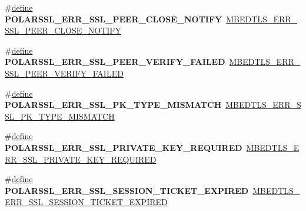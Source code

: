 \begin{DoxyCompactItemize}
\item 
\mbox{\label{compat-1_83_8h_a8e4c3b27c9e170358c71c83683c554da}} 
\#\hyperlink{structdefine}{define} {\bfseries P\+O\+L\+A\+R\+S\+S\+L\+\_\+\+E\+R\+R\+\_\+\+S\+S\+L\+\_\+\+P\+E\+E\+R\+\_\+\+C\+L\+O\+S\+E\+\_\+\+N\+O\+T\+I\+FY}~\hyperlink{ssl_8h_ac5e16e4c94a7e4ba0cf6b95c4547ddb1}{M\+B\+E\+D\+T\+L\+S\+\_\+\+E\+R\+R\+\_\+\+S\+S\+L\+\_\+\+P\+E\+E\+R\+\_\+\+C\+L\+O\+S\+E\+\_\+\+N\+O\+T\+I\+FY}
\item 
\mbox{\label{compat-1_83_8h_ab8af28117b65fb455f8bc95b7f8a1f8a}} 
\#\hyperlink{structdefine}{define} {\bfseries P\+O\+L\+A\+R\+S\+S\+L\+\_\+\+E\+R\+R\+\_\+\+S\+S\+L\+\_\+\+P\+E\+E\+R\+\_\+\+V\+E\+R\+I\+F\+Y\+\_\+\+F\+A\+I\+L\+ED}~\hyperlink{ssl_8h_ac53adea4d4086a8e344459b053a5717b}{M\+B\+E\+D\+T\+L\+S\+\_\+\+E\+R\+R\+\_\+\+S\+S\+L\+\_\+\+P\+E\+E\+R\+\_\+\+V\+E\+R\+I\+F\+Y\+\_\+\+F\+A\+I\+L\+ED}
\item 
\mbox{\label{compat-1_83_8h_a3bcdd01778f66202a4e9d9a16ac7e271}} 
\#\hyperlink{structdefine}{define} {\bfseries P\+O\+L\+A\+R\+S\+S\+L\+\_\+\+E\+R\+R\+\_\+\+S\+S\+L\+\_\+\+P\+K\+\_\+\+T\+Y\+P\+E\+\_\+\+M\+I\+S\+M\+A\+T\+CH}~\hyperlink{ssl_8h_acfee5259b88126fa1f8fc5437a089f57}{M\+B\+E\+D\+T\+L\+S\+\_\+\+E\+R\+R\+\_\+\+S\+S\+L\+\_\+\+P\+K\+\_\+\+T\+Y\+P\+E\+\_\+\+M\+I\+S\+M\+A\+T\+CH}
\item 
\mbox{\label{compat-1_83_8h_a68feacf7e93dc9d0128e3888ae4a4858}} 
\#\hyperlink{structdefine}{define} {\bfseries P\+O\+L\+A\+R\+S\+S\+L\+\_\+\+E\+R\+R\+\_\+\+S\+S\+L\+\_\+\+P\+R\+I\+V\+A\+T\+E\+\_\+\+K\+E\+Y\+\_\+\+R\+E\+Q\+U\+I\+R\+ED}~\hyperlink{ssl_8h_a4c40a91dc331782b9aaa82812fc38eb4}{M\+B\+E\+D\+T\+L\+S\+\_\+\+E\+R\+R\+\_\+\+S\+S\+L\+\_\+\+P\+R\+I\+V\+A\+T\+E\+\_\+\+K\+E\+Y\+\_\+\+R\+E\+Q\+U\+I\+R\+ED}
\item 
\mbox{\label{compat-1_83_8h_afd2d6575711d0c484fbc9da8dbca3532}} 
\#\hyperlink{structdefine}{define} {\bfseries P\+O\+L\+A\+R\+S\+S\+L\+\_\+\+E\+R\+R\+\_\+\+S\+S\+L\+\_\+\+S\+E\+S\+S\+I\+O\+N\+\_\+\+T\+I\+C\+K\+E\+T\+\_\+\+E\+X\+P\+I\+R\+ED}~\hyperlink{ssl_8h_a8b1558e0b749f8b5f856d73d8b9869e9}{M\+B\+E\+D\+T\+L\+S\+\_\+\+E\+R\+R\+\_\+\+S\+S\+L\+\_\+\+S\+E\+S\+S\+I\+O\+N\+\_\+\+T\+I\+C\+K\+E\+T\+\_\+\+E\+X\+P\+I\+R\+ED}
\item 
\mbox{\label{compat-1_83_8h_ae047b69d2893d835285016db717d4f56}} 

\end{DoxyCompactItemize}
